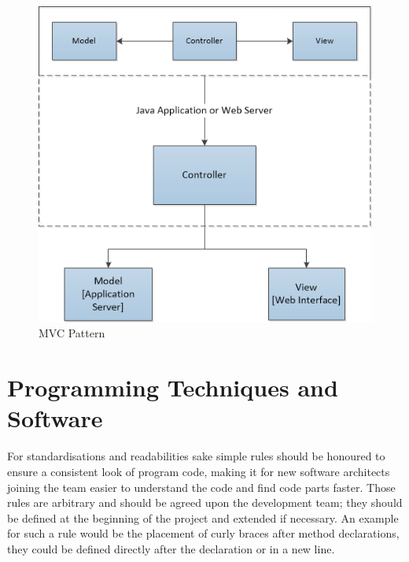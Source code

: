 \documentclass[11pt,a4paper,oneside,svgnames]{report}
\begin{document}
\begin{figure}[H]
 \begin{center}
  \includegraphics[width=\textwidth]{MVC-small.png}
 \end{center}
 \caption{MVC Pattern}
\end{figure}

\section{Programming Techniques and Software}
For standardisations and readabilities sake simple rules should be honoured to ensure a consistent look of program code, making it for new software architects joining the team easier to understand the code and find code parts faster. Those rules are arbitrary and should be agreed upon the development team; they should be defined at the beginning of the project and extended if necessary. An example for such a rule would be the placement of curly braces after method declarations, they could be defined directly after the declaration or in a new line.

\end{document}
